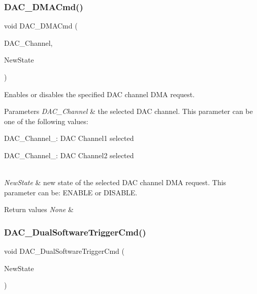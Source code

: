 \subsubsection{\texorpdfstring{DAC\_DMACmd()}{DAC\_DMACmd()}}
{\footnotesize\ttfamily void D\+A\+C\+\_\+\+D\+M\+A\+Cmd (\begin{DoxyParamCaption}\item[{uint32\+\_\+t}]{D\+A\+C\+\_\+\+Channel,  }\item[{\mbox{\hyperlink{group___exported__types_gac9a7e9a35d2513ec15c3b537aaa4fba1}{Functional\+State}}}]{New\+State }\end{DoxyParamCaption})}



Enables or disables the specified D\+AC channel D\+MA request. 


\begin{DoxyParams}{Parameters}
{\em D\+A\+C\+\_\+\+Channel} & the selected D\+AC channel. This parameter can be one of the following values\+: \begin{DoxyItemize}
\item D\+A\+C\+\_\+\+Channel\+\_\+: D\+AC Channel1 selected \item D\+A\+C\+\_\+\+Channel\+\_\+: D\+AC Channel2 selected \end{DoxyItemize}
\\
\hline
{\em New\+State} & new state of the selected D\+AC channel D\+MA request. This parameter can be\+: E\+N\+A\+B\+LE or D\+I\+S\+A\+B\+LE. \\
\hline
\end{DoxyParams}

\begin{DoxyRetVals}{Return values}
{\em None} & \\
\hline
\end{DoxyRetVals}
\mbox{\label{group___d_a_c___exported___functions_gab4d3b364a6b184dcd65f3b294ebf56dc}} 
\subsubsection{\texorpdfstring{DAC\_DualSoftwareTriggerCmd()}{DAC\_DualSoftwareTriggerCmd()}}
{\footnotesize\ttfamily void D\+A\+C\+\_\+\+Dual\+Software\+Trigger\+Cmd (\begin{DoxyParamCaption}\item[{\mbox{\hyperlink{group___exported__types_gac9a7e9a35d2513ec15c3b537aaa4fba1}{Functional\+State}}}]{New\+State }\end{DoxyParamCaption})}



